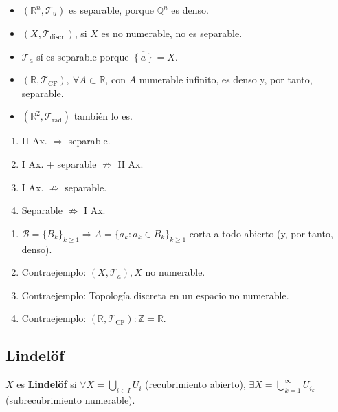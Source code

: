 \begin{ej}
\begin{itemize}
    \item $\left( \mathbb{R}^n, \mathcal{T}_u \right)$ es separable, porque $\mathbb{Q}^n$ es denso.
    \item $\left( X, \mathcal{T}_{\text{discr.}} \right)$, si $X$ es no numerable, no es separable.
    \item $\mathcal{T}_a$ sí es separable porque $\overline{\left\{ a \right\}} = X$.
    \item $\left( \mathbb{R}, \mathcal{T}_{\text{CF}} \right),\ \forall A \subset \mathbb{R}$, con $A$ numerable infinito, es denso y, por tanto, separable. 
    \item $\left( \mathbb{R}^2, \mathcal{T}_{\text{rad}} \right)$ también lo es. %
\end{itemize}
\end{ej}

\begin{prop}
\begin{enumerate}
    \item II Ax. $\Rightarrow$ separable. 
    \item I Ax. $+$ separable $\not \Rightarrow$ II Ax. 
    \item I Ax. $\not \Rightarrow$ separable. 
    \item Separable $\not \Rightarrow$ I Ax. 
\end{enumerate}
\end{prop}
\begin{demo}
\begin{enumerate}
    \item $\mathcal{B} = \{B_k\}_{k \ge 1} \Rightarrow A = \{a_k : a_k \in B_k\}_{k \ge 1}$ corta a todo abierto (y, por tanto, denso).
    \item Contraejemplo: $\left( X, \mathcal{T}_a \right), X$ no numerable.
    \item Contraejemplo: Topología discreta en un espacio no numerable.
    \item Contraejemplo: $\left( \mathbb{R}, \mathcal{T}_{\text{CF}} \right) : \overline{\mathbb{Z}} = \mathbb{R}$.
\end{enumerate}
\end{demo}

\subsection{Lindelöf}%
\label{sub:lindelof}
\begin{defi}[Lindelöf]
$X$ es \textbf{Lindelöf} si $\forall X = \bigcup_{i \in I} U_i$ (recubrimiento abierto), $\exists X = \bigcup_{k=1}^{\infty} U_{i_k}$ (subrecubrimiento numerable). 
\end{defi}

